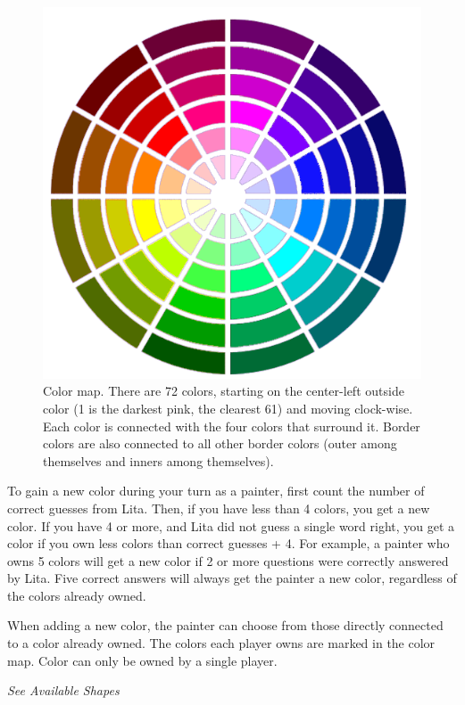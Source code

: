 \documentclass[twocolumn]{article}
\newcommand{\sublvl}[1]{\vspace{0.3cm}\large{\textit{#1}}\vspace{0.1cm}}
\begin{document}
\begin{figure}[th!]
\centering
\includegraphics[scale=0.6]{../boards/map_1.png}
\caption{Color map. There are 72 colors, starting on the center-left outside color (1 is the darkest pink, the clearest 61) and moving clock-wise. Each color is connected with the four colors that surround it. Border colors are also connected to all other border colors (outer among themselves and inners among themselves).}
\label{fig:color_map}
\end{figure}

To gain a new color during your turn as a painter, first count the number of correct guesses from Lita. Then, if you have less than 4 colors, you get a new color. If you have 4 or more, and Lita did not guess a single word right, you get a color if you own less colors than correct guesses + 4. For example, a painter who owns 5 colors will get a new color if 2 or more questions were correctly answered by Lita. Five correct answers will always get the painter a new color, regardless of the colors already owned.

When adding a new color, the painter can choose from those directly connected to a color already owned. The colors each player owns are marked in the color map. Color can only be owned by a single player.


\sublvl{See Available Shapes}
\end{document}
